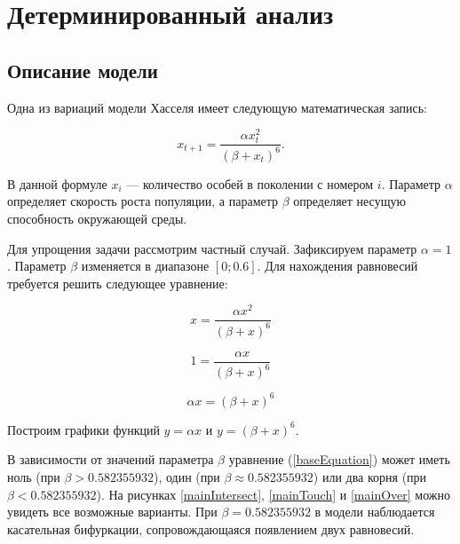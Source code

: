 \section{Детерминированный анализ}

    \subsection{Описание модели}

        Одна из вариаций модели Хасселя \cite{densityDependenceInSingleSpeciesPopulations} имеет следующую математическая запись:

        \begin{equation}
            \label{origin}
            x_{t+1} = \frac{\alpha x_t^2}{(\beta + x_t)^6}.
        \end{equation}

        В данной формуле \(x_i\) --- количество особей в поколении с номером \(i\). Параметр \(\alpha\) определяет скорость роста популяции, а параметр \(\beta\) определяет несущую способность окружающей среды.
    
        Для упрощения задачи рассмотрим частный случай. Зафиксируем параметр \(\alpha = 1\). Параметр \(\beta\) изменяется в диапазоне \([0; 0.6]\). 
        Для нахождения равновесий требуется решить следующее уравнение:  

        \[x = \frac{\alpha x^2}{(\beta + x)^6}\]
    
        \[1 = \frac{\alpha x}{(\beta + x)^6}\]

        \begin{equation}
            \label{baseEquation}
            \alpha x = (\beta + x)^6
        \end{equation}

        Построим графики функций \(y = \alpha x\) и \(y = (\beta + x)^6\). 
        
        В зависимости от значений параметра \(\beta\) уравнение (\ref{baseEquation}) может иметь ноль (при \(\beta > 0.582355932\)), один (при \(\beta \approx 0.582355932\)) или два корня (при \(\beta < 0.582355932\)). На рисунках \ref{mainIntersect}, \ref{mainTouch} и \ref{mainOver} можно увидеть все возможные варианты. При \(\beta=0.582355932\) в модели наблюдается касательная бифуркации, сопровождающаяся появлением двух равновесий.

